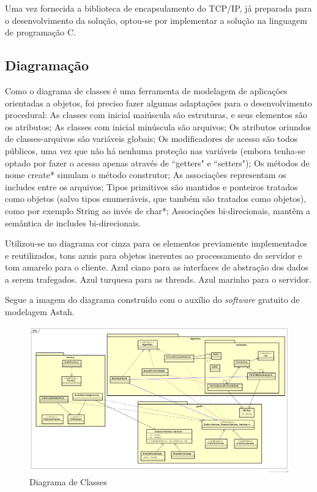 \documentclass[12pt]{article}
\begin{document}
Uma vez fornecida a biblioteca de encapsulamento do TCP/IP, já preparada para o desenvolvimento da solução, optou-se por implementar a solução na linguagem de programação C.

\subsection{Diagramação}\label{sec:diagramacao}

Como o diagrama de classes é uma ferramenta de modelagem de aplicações orientadas a objetos, foi preciso fazer algumas adaptações para o desenvolvimento procedural:
As classes com inicial maiúscula são estruturas, e seus elementos são os atributos;
As classes com inicial minúscula são arquivos;
Os atributos oriundos de classes-arquivos são variáveis globais;
Os modificadores de acesso são todos públicos, uma vez que não há nenhuma proteção nas variáveis (embora tenha-se optado por fazer o acesso apenas através de ``getters" e ``setters"); Os métodos de nome create* simulam o método construtor;
As associações representam os includes entre os arquivos;
Tipos primitivos são mantidos e ponteiros tratados como objetos (salvo tipos enumeráveis, que também são tratados como objetos), como por exemplo String ao invés de char*;
Associações bi-direcionais, mantêm a semântica de includes bi-direcionais.

Utilizou-se no diagrama cor cinza para os elementos previamente implementados e reutilizados, tons azuis para objetos inerentes ao processamento do servidor e tom amarelo para o cliente. Azul ciano para as interfaces de abstração dos dados a serem trafegados. Azul turquesa para as threads. Azul marinho para o servidor.

Segue a imagem do diagrama construído com o auxílio do \textit{software} gratuito de modelagem Astah.

\begin{landscape}
\centering
\begin{figure}[p]
\includegraphics[width=1.4\textwidth]{ClassDiagram.png}
\caption{Diagrama de Classes}
\label{fig:classDiagram}
\end{figure}
\end{landscape}
\restoregeometry
\end{document}

